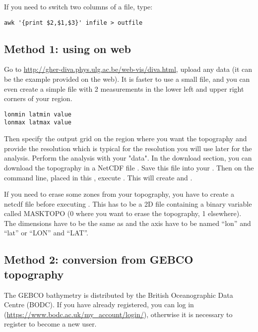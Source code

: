If you need to switch two columns of a file, type:
\begin{verbatim}
awk '{print $2,$1,$3}' infile > outfile
\end{verbatim}
\etips

\subsection{Method 1: using \diva on web}

Go to \url{http://gher-diva.phys.ulg.ac.be/web-vis/diva.html}, upload any data (it can be the example provided on the web).
It is faster to use a small file, and you can even create a simple file with 2 measurements in the lower left and upper right corners of 
your region.
\begin{verbatim}
lonmin latmin value
lonmax latmax value
\end{verbatim}
Then specify the output grid on the region where you want the topography and provide the resolution which is typical for
the resolution you will use later for the analysis.
Perform the analysis with your "data". In the download section, you can download the topography in a NetCDF file
. Save this file into your . Then on the command line, placed in this ,
execute . This will create  and .

If you need to erase some zones from your topography, you have to create a netcdf file  before executing 
. This  has to be a 2D file containing a binary variable called MASKTOPO 
(0 where you want to erase the topography, 1 elsewhere). The dimensions have to be the same as  and the axis
have to be named ``lon'' and ``lat'' or ``LON'' and ``LAT''. 


\subsection{Method 2: conversion from GEBCO topography\label{sec:topogebco}}

The GEBCO bathymetry is distributed by the British Oceanographic Data Centre (BODC). If you have already registered, you can log in (\url{https://www.bodc.ac.uk/my\_account/login/}), otherwise it is necessary to register to become a new user. 


